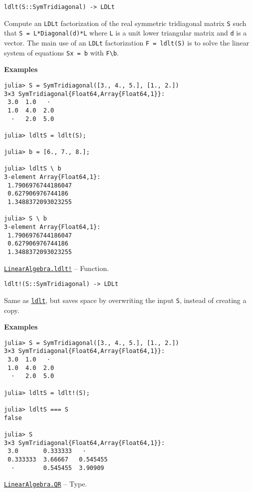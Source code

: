 \begin{adjustwidth}{2em}{0pt}


\begin{verbatim}
ldlt(S::SymTridiagonal) -> LDLt
\end{verbatim}

Compute an \texttt{LDLt} factorization of the real symmetric tridiagonal matrix \texttt{S} such that \texttt{S = L*Diagonal(d)*L{\textquotesingle}} where \texttt{L} is a unit lower triangular matrix and \texttt{d} is a vector. The main use of an \texttt{LDLt} factorization \texttt{F = ldlt(S)} is to solve the linear system of equations \texttt{Sx = b} with \texttt{F{\textbackslash}b}.

\textbf{Examples}


\begin{verbatim}
julia> S = SymTridiagonal([3., 4., 5.], [1., 2.])
3×3 SymTridiagonal{Float64,Array{Float64,1}}:
 3.0  1.0   ⋅
 1.0  4.0  2.0
  ⋅   2.0  5.0

julia> ldltS = ldlt(S);

julia> b = [6., 7., 8.];

julia> ldltS \ b
3-element Array{Float64,1}:
 1.7906976744186047
 0.627906976744186
 1.3488372093023255

julia> S \ b
3-element Array{Float64,1}:
 1.7906976744186047
 0.627906976744186
 1.3488372093023255
\end{verbatim}



\end{adjustwidth}
\hypertarget{9183185033445403339}{} 
\hyperlink{9183185033445403339}{\texttt{LinearAlgebra.ldlt!}}  -- {Function.}

\begin{adjustwidth}{2em}{0pt}


\begin{verbatim}
ldlt!(S::SymTridiagonal) -> LDLt
\end{verbatim}

Same as \hyperlink{8934377864822491393}{\texttt{ldlt}}, but saves space by overwriting the input \texttt{S}, instead of creating a copy.

\textbf{Examples}


\begin{verbatim}
julia> S = SymTridiagonal([3., 4., 5.], [1., 2.])
3×3 SymTridiagonal{Float64,Array{Float64,1}}:
 3.0  1.0   ⋅
 1.0  4.0  2.0
  ⋅   2.0  5.0

julia> ldltS = ldlt!(S);

julia> ldltS === S
false

julia> S
3×3 SymTridiagonal{Float64,Array{Float64,1}}:
 3.0       0.333333   ⋅
 0.333333  3.66667   0.545455
  ⋅        0.545455  3.90909
\end{verbatim}



\end{adjustwidth}
\hypertarget{16913872014958777367}{} 
\hyperlink{16913872014958777367}{\texttt{LinearAlgebra.QR}}  -- {Type.}

